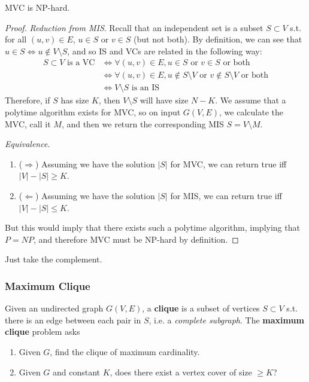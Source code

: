 \documentclass{article}
\begin{document}
      \begin{theorem}[MVC]
        MVC is NP-hard. 
      \end{theorem}
      \begin{proof}
        \textit{Reduction from MIS}. Recall that an independent set is a subset $S \subset V$ s.t. for all $(u, v) \in E$, $u \in S$ or $v \in S$ (but not both). By definition, we can see that $u \in S \iff u \not\in V \setminus S$, and so IS and VCs are related in the following way: 
        \begin{align}
          S \subset V \text{ is a VC} & \iff \forall (u, v) \in E, u \in S \text{ or } v \in S \text{ or both} \\
                                      & \iff \forall (u, v) \in E, u \not\in S \setminus V \text{ or } v \not\in S \setminus V \text{ or both} \\
                                      & \iff V \setminus S \text{ is an IS}
        \end{align}
        Therefore, if $S$ has size $K$, then $V \setminus S$ will have size $N - K$. We assume that a polytime algorithm exists for MVC, so on input $G(V, E)$, we calculate the MVC, call it $M$, and then we return the corresponding MIS $S = V \setminus M$. 

        \textit{Equivalence}. 
        \begin{enumerate}
          \item ($\Rightarrow$) Assuming we have the solution $|S|$ for MVC, we can return true iff $|V| - |S| \geq K$. 
          \item ($\Leftarrow$) Assuming we have the solution $|S|$ for MIS, we can return true iff $|V| - |S| \leq K$. 
        \end{enumerate}
        But this would imply that there exists such a polytime algorithm, implying that $P = NP$, and therefore MVC must be NP-hard by definition. 
      \end{proof}

      \begin{example}
        Just take the complement. 
      \end{example}

    \subsubsection{Maximum Clique}

      \begin{definition}
        Given an undirected graph $G(V, E)$, a \textbf{clique} is a subset of vertices $S \subset V$ s.t. there is an edge between each pair in $S$, i.e. a \textit{complete subgraph}. The \textbf{maximum clique} problem asks 
        \begin{enumerate}
          \item Given $G$, find the clique of maximum cardinality. 
          \item Given $G$ and constant $K$, does there exist a vertex cover of size $\geq K$? 
        \end{enumerate}
      \end{definition} 
\end{document}
